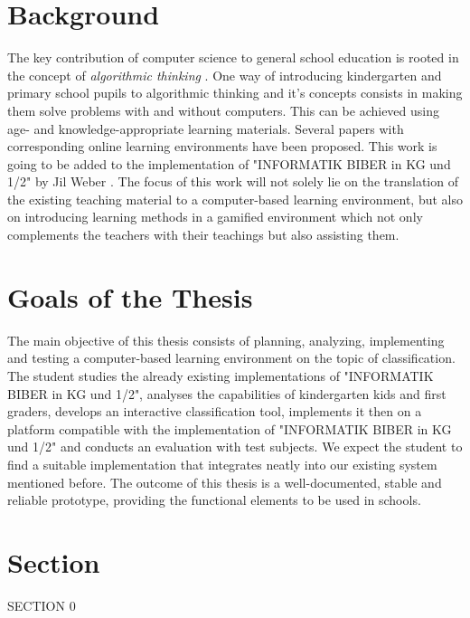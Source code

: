 \section*{Background}
The key contribution of computer science to general school education is rooted
in the concept of \textit{algorithmic thinking} %
. One way of
introducing kindergarten and primary school pupils to algorithmic thinking and
it's concepts consists in making them solve problems with and without computers.
This can be achieved using age- and knowledge-appropriate learning materials.
Several papers with corresponding online learning environments have been
proposed.
This work is going to be added to
the implementation of "INFORMATIK BIBER in KG und 1/2" by Jil Weber
. The focus of this work will not solely lie on the translation of
the existing teaching material to a computer-based learning environment, but
also on introducing learning methods in a gamified environment which not only
complements the teachers with their teachings but also assisting them.

\section*{Goals of the Thesis}
The main objective of this thesis consists of planning, analyzing, implementing
and testing a computer-based learning environment on the topic of
classification. The student studies the already existing implementations of
"INFORMATIK BIBER in KG und 1/2", analyses the capabilities of kindergarten kids
and first graders, develops an interactive classification tool, implements it
then on a platform compatible with the implementation of "INFORMATIK BIBER in KG
und 1/2" and conducts an evaluation with test subjects. We expect the student to
find a suitable implementation that integrates neatly into our existing system
mentioned before. The outcome of this thesis is a well-documented, stable and
reliable prototype, providing the functional elements to be used in schools.

\section{Section}

SECTION 0
